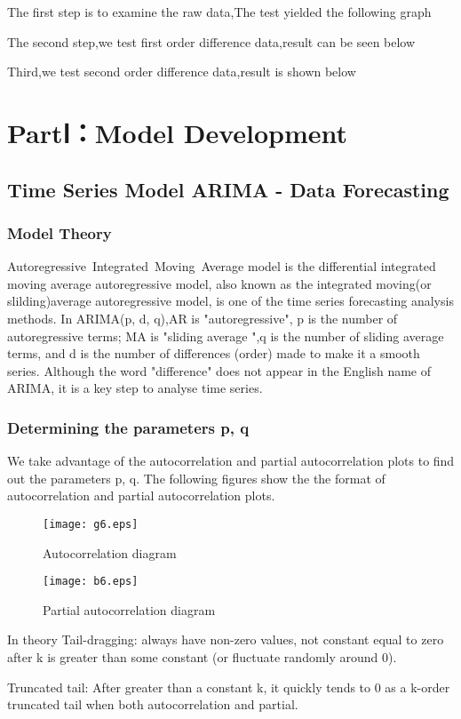 \documentclass{mcmthesis}
\begin{document}
The first step is to examine the raw data,The test yielded the following graph

The second step,we test first order difference data,result can be seen below

Third,we test second order difference data,result is shown below


\section{PartⅠ：Model Development }
\subsection{Time Series Model ARIMA - Data Forecasting }
\subsubsection{Model Theory}
Autoregressive Integrated Moving Average model is the differential integrated moving average autoregressive model, 
also known as the integrated moving(or slilding)average autoregressive model, 
is one of the time series forecasting analysis methods. 
In ARIMA(p, d, q),AR is "autoregressive", p is the number of autoregressive terms;
MA is "sliding average ",q is the number of sliding average terms, and d is the number of differences (order) made to make it a smooth series.
Although the word "difference" does not appear in the English name of ARIMA, it is a key step to analyse time series.
\subsubsection{Determining the parameters p, q }
We take advantage of the autocorrelation and partial autocorrelation plots to find out the parameters p, q.
The following figures show the the format of autocorrelation and partial autocorrelation plots.
\begin{figure}[!h]
  \centering 
  \texttt{[image: g6.eps]}
  \caption{Autocorrelation diagram}
  \texttt{[image: b6.eps]}
  \caption{Partial autocorrelation diagram} \label{fig6}
\end{figure}

In theory
Tail-dragging: always have non-zero values, not constant equal to zero after k is greater than some constant (or fluctuate randomly around 0).

Truncated tail: After greater than a constant k, it quickly tends to 0 as a k-order truncated tail when both autocorrelation and partial.
\end{document}
